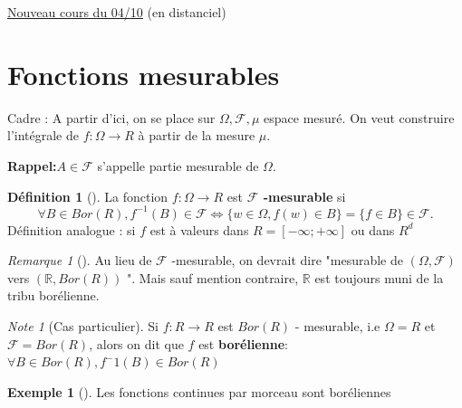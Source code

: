 \documentclass{article}
\theoremstyle{plain}%
\theoremstyle{definition}
\newtheorem{defn}{Définition}[section]
\newtheorem{exmp}{Exemple}[section]
\theoremstyle{remark}
\newtheorem*{rem}{Remarque}
\newtheorem*{note}{Note}
\begin{document}
\underline{Nouveau cours du 04/10} (en distanciel)\\

\section{Fonctions mesurables}
Cadre : A partir d'ici, on se place sur $ \Omega, \mathcal{F, \mu } $ espace mesuré. On veut construire l'intégrale de $ f: \Omega \to R $ à partir de la mesure $ \mu  $.

\textbf{Rappel:}$ A \in \mathcal{F} $ s'appelle partie mesurable de $ \Omega  $.
\begin{defn}[]
    La fonction $ f: \Omega \to R $ est \textbf{$ \mathcal{F} $ -mesurable} si 
    \[
        \forall B \in Bor(R), f^{-1}(B) \in \mathcal{F} \Leftrightarrow\{w \in \Omega, f(w) \in B\} = \{f \in B\} \in \mathcal{F}
    .\]
    Définition analogue : si $ f $ est à valeurs dans $ R=[-\infty ; + \infty ] $ ou dans $ R^d $ 
\end{defn}

\begin{rem}[]
    Au lieu de $ \mathcal{F} $ -mesurable, on devrait dire "mesurable de $ (\Omega , \mathcal{F})$ vers $ (\mathbb{R}, Bor(R) )$ ". Mais sauf mention contraire, $ \mathbb{R} $ est toujours muni de la tribu borélienne. 
\end{rem}
\begin{note}[Cas particulier]
    Si $ f: R \to R $ est $ Bor(R) $ - mesurable, i.e $ \Omega =R $ et $ \mathcal{F}=Bor(R) $, alors on dit que $ f $ est \textbf{borélienne}: $ \forall B \in Bor(R), f^-1 (B) \in Bor(R) $ 
\end{note}
\begin{exmp}[]
    Les fonctions continues par morceau sont boréliennes
\end{exmp}
\end{document}
